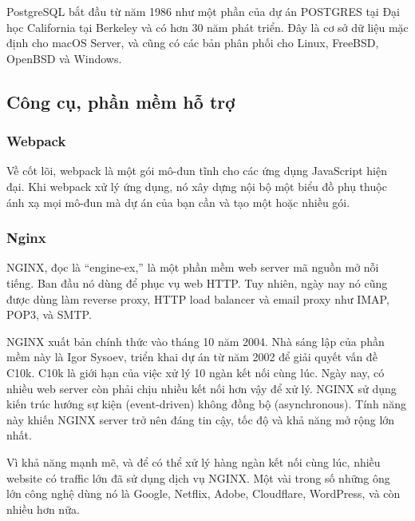 PostgreSQL bắt đầu từ năm 1986 như một phần của dự án POSTGRES tại Đại học California tại Berkeley và có hơn 30 năm phát triển. Đây là cơ sở dữ liệu mặc định cho macOS Server, và cũng có các bản phân phối cho Linux, FreeBSD, OpenBSD và Windows.

\subsection{Công cụ, phần mềm hỗ trợ}

\subsubsection{Webpack}
Về cốt lõi, webpack là một gói mô-đun tĩnh cho các ứng dụng JavaScript hiện đại. Khi webpack xử lý ứng dụng, nó xây dựng nội bộ một biểu đồ phụ thuộc ánh xạ mọi mô-đun mà dự án của bạn cần và tạo một hoặc nhiều gói.

\subsubsection{Nginx}

NGINX, đọc là “engine-ex,”  là một phần mềm web server mã nguồn mở nỗi tiếng. Ban đầu nó dùng để phục vụ web HTTP. Tuy nhiên, ngày nay nó cũng được dùng làm reverse proxy, HTTP load balancer và email proxy như IMAP, POP3, và SMTP.

NGINX xuất bản chính thức vào tháng 10 năm 2004. Nhà sáng lập của phần mềm này là Igor Sysoev, triển khai dự án từ năm 2002 để giải quyết vấn đề C10k. C10k là giới hạn của việc xử lý 10 ngàn kết nối cùng lúc. Ngày nay, có nhiều web server còn phải chịu nhiều kết nối hơn vậy để xử lý. NGINX sử dụng kiến trúc hướng sự kiện (event-driven) không đồng bộ (asynchronous). Tính năng này khiến NGINX server trở nên đáng tin cậy, tốc độ và khả năng mở rộng lớn nhất.

Vì khả năng mạnh mẽ, và để có thể xử lý hàng ngàn kết nối cùng lúc, nhiều website có traffic lớn đã sử dụng dịch vụ NGINX. Một vài trong số những ông lớn công nghệ dùng nó là Google, Netflix, Adobe, Cloudflare, WordPress, và còn nhiều hơn nữa.


